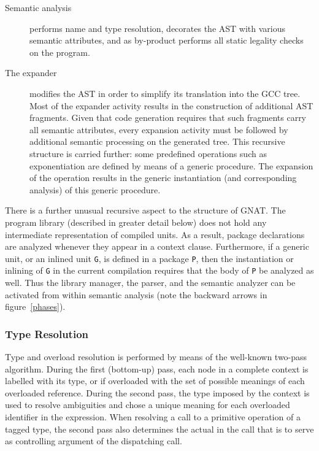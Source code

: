 \begin{description}

\item[Semantic analysis]  performs name and type resolution, decorates the
AST with various semantic attributes,  and as by-product performs all
static legality checks on the program.

\item[The expander] modifies the AST in  order to simplify its translation
into the GCC tree. Most of the expander activity results in 
the construction of additional AST fragments.  Given that code generation 
requires that such fragments carry all semantic attributes,  every expansion
activity must be followed by additional semantic processing on the generated
tree. This recursive structure is carried further: some predefined operations
such as exponentiation are defined by means of a generic procedure. The
expansion of the operation results in the generic instantiation 
(and corresponding analysis) of this generic procedure. 

\end{description}

There is a further unusual recursive aspect to the structure of
GNAT. The program library (described in greater detail below) does not
hold any intermediate representation of compiled units. As a result,
package declarations are analyzed whenever they appear in a context
clause.  Furthermore, if a generic unit, or an inlined unit {\tt G},
is defined in a package {\tt P}, then the instantiation or inlining of
{\tt G} in the current compilation requires that the body of {\tt P}
be analyzed as well. Thus the library manager, the parser, and the
semantic analyzer can be activated from within semantic analysis (note
the backward arrows in figure~\ref{phases}).


\subsubsection{Type Resolution}

Type and overload resolution is performed by means of the well-known two-pass
algorithm. During the first (bottom-up) pass, each node in a complete context
is labelled with its type, or if overloaded with the set of possible meanings
of each overloaded reference. During the second pass, the type imposed by the
context is used to resolve ambiguities and chose a unique meaning for each
overloaded identifier in the expression. When resolving a call to a primitive
operation of a tagged type, the second pass also determines the actual in
the call that is to serve as controlling argument of the dispatching call. 
\\


